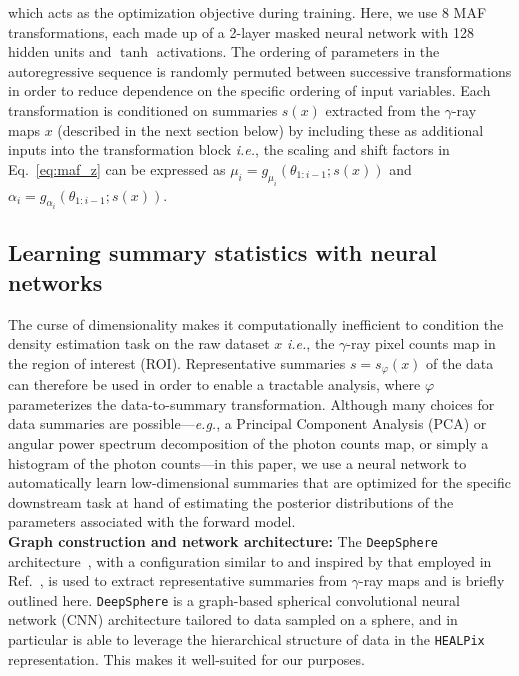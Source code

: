 \documentclass[prd,aps,10pt,nofootinbib,twocolumn,superscriptaddress,preprintnumbers,balancelastpage,longbibliography,floatfix]{revtex4-2}
\begin{document}
which acts as the optimization objective during training. Here, we use 8 MAF transformations, each made up of a 2-layer masked neural network with 128 hidden units and $\tanh$ activations. The ordering of parameters in the autoregressive sequence is randomly permuted between successive transformations in order to reduce dependence on the specific ordering of input variables. Each transformation is conditioned on summaries $s(x)$ extracted from the $\gamma$-ray maps $x$ (described in the next section below) by including these as additional inputs into the transformation block \emph{i.e.}, the scaling and shift factors in Eq.~\eqref{eq:maf_z} can be expressed as $\mu_{i}=g_{\mu_{i}}\left({\theta}_{1: i-1} ; {s(x)}\right)$ and $\alpha_i = g_{\alpha_{i}}\left({\theta}_{1: i-1} ; {s(x)}\right)$.

\subsection{Learning summary statistics with neural networks}

The curse of dimensionality makes it computationally inefficient to condition the density estimation task on the raw dataset $x$ \emph{i.e.}, the $\gamma$-ray pixel counts map in the region of interest (ROI). Representative summaries $s = s_\varphi(x)$ of the data can therefore be used in order to enable a tractable analysis, where $\varphi$ parameterizes the data-to-summary transformation. Although many choices for data summaries are possible---\emph{e.g.}, a Principal Component Analysis (PCA) or angular power spectrum decomposition of the photon counts map, or simply a histogram of the photon counts---in this paper, we use a neural network to automatically learn low-dimensional summaries that are optimized for the specific downstream task at hand of estimating the posterior distributions of the parameters associated with the forward model. \\

\noindent
\textbf{Graph construction and network architecture:}
The \texttt{DeepSphere} architecture~\cite{DBLP:conf/iclr/DefferrardMGP20,Perraudin:2018rbt,deepsphere_rlgm}, with a configuration similar to and inspired by that employed in Ref.~\cite{List:2020mzd}, is used to extract representative summaries from $\gamma$-ray maps and is briefly outlined here. \texttt{DeepSphere} is a graph-based spherical convolutional neural network (CNN) architecture tailored to data sampled on a sphere, and in particular is able to leverage the hierarchical structure of data in the \texttt{HEALPix} representation. This makes it well-suited for our purposes.
\end{document}
